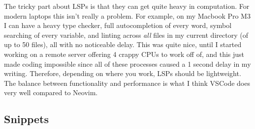   The tricky part about LSPs is that they can get quite heavy in computation. For modern laptops this isn't really a problem. For example, on my Macbook Pro M3 I can have a heavy type checker, full autocompletion of every word,  symbol searching of every variable, and linting across \textit{all} files in my current directory (of up to 50 files), all with no noticeable delay. This was quite nice, until I started working on a remote server offering 4 crappy CPUs to work off of, and this just made coding impossible since all of these processes caused a 1 second delay in my writing. Therefore, depending on where you work, LSPs should be lightweight. The balance between functionality and performance is what I think VSCode does very well compared to Neovim. 

\subsection{Snippets}

